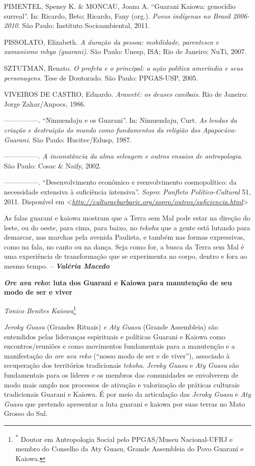 PIMENTEL, Spensy K. \& MONCAU, Joana A. ``Guarani Kaiowa: genocídio
surreal''. In: Ricardo, Beto; Ricardo, Fany (org.). \emph{Povos
indígenas no Brasil 2006-2010}. São Paulo: Instituto Socioambiental,
2011.

PISSOLATO, Elizabeth. \emph{A duração da pessoa: mobilidade, parentesco
e xamanismo mbya (guarani)}. São Paulo: Unesp, ISA; Rio de Janeiro:
NuTi, 2007.

SZTUTMAN, Renato. \emph{O profeta e o principal: a ação política
ameríndia e seus personagens}. Tese de Doutorado. São Paulo: PPGAS-USP,
2005.

VIVEIROS DE CASTRO, Eduardo. \emph{Araweté: os deuses canibais}. Rio de
Janeiro: Jorge Zahar/Anpocs, 1986.

---------------. ``Nimuendaju e os Guarani''. In: Nimuendaju, Curt.
\emph{As lendas da criação e destruição do mundo como fundamentos da
religião dos Apapocúva-Guarani}. São Paulo: Hucitec/Edusp, 1987.

---------------. \emph{A inconstância da alma selvagem e outros ensaios
de antropologia}. São Paulo: Cosac \& Naify, 2002.

---------------. ``Desenvolvimento econômico e reenvolvimento
cosmopolítico: da necessidade extensiva à suficiência intensiva''.
\emph{Sopro}: \emph{Panfleto Político-Cultural} 51, 2011. Disponível em
\textless{}\href{http://culturaebarbarie.org/sopro/outros/suficiencia.html}{\emph{http://culturaebarbarie.org/sopro/outros/suficiencia.html}}\textgreater{}

As falas guarani e kaiowa mostram que a Terra sem Mal pode estar na
direção do leste, ou do oeste, para cima, para baixo, no \emph{tekoha}
que a gente está lutando para demarcar, nas marchas pela avenida
Paulista, e também nas formas expressivas, como na fala, no canto ou na
dança. Seja como for, a busca da Terra sem Mal é uma experiência de
transformação que se experimenta no corpo, dentro e fora ao mesmo tempo.
-- \emph{\textbf{Valéria Macedo}}

\textbf{\emph{Ore ava reko}: luta dos Guarani e Kaiowa para manutenção
de seu modo de ser e viver}

\emph{Tonico Benites Kaiowa}\footnote{\textsuperscript{*} Doutor em
  Antropologia Social pelo PPGAS/Museu Nacional-UFRJ e membro do
  Conselho da Aty Guasu, Grande Assembleia do Povo Guarani e Kaiowa.}

\emph{Jeroky Guasu} (Grandes Rituais) \emph{e Aty Guasu} (Grande
Assembleia) são entendidos pelas lideranças espirituais e políticas
Guarani e Kaiowa como encontros/reuniões e como movimentos fundamentais
para a manutenção e a manifestação do \emph{ore ava reko} (``nosso modo
de ser e de viver''), associado à recuperação dos territórios
tradicionais \emph{tekoha}. \emph{Jeroky Guasu} e \emph{Aty Guasu} são
fundamentais para os líderes e os membros das comunidades se envolverem
de modo mais amplo nos processos de ativação e valorização de práticas
culturais tradicionais Guarani e Kaiowa. É por meio da articulação das
\emph{Jeroky Guasu} e \emph{Aty Guasu} que pretendo apresentar a luta
guarani e kaiowa por suas terras no Mato Grosso do Sul.

